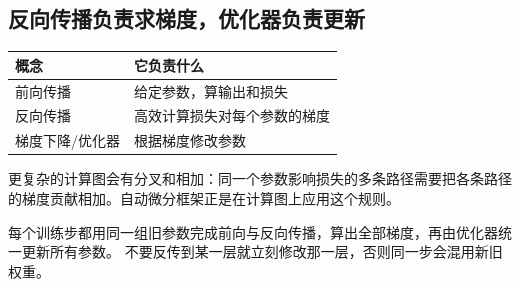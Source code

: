 \subsection{反向传播负责求梯度，优化器负责更新}

\begin{center}
\begin{tabularx}{\linewidth}{@{}p{29mm}X@{}}\toprule
概念 & 它负责什么\\\midrule
前向传播 & 给定参数，算输出和损失\\
反向传播 & 高效计算损失对每个参数的梯度\\
梯度下降/优化器 & 根据梯度修改参数\\
\bottomrule\end{tabularx}
\end{center}

更复杂的计算图会有分叉和相加：同一个参数影响损失的多条路径需要把各条路径的梯度贡献相加。自动微分框架正是在计算图上应用这个规则。

\begin{warningbox}
每个训练步都用同一组旧参数完成前向与反向传播，算出全部梯度，再由优化器统一更新所有参数。
不要反传到某一层就立刻修改那一层，否则同一步会混用新旧权重。
\end{warningbox}
